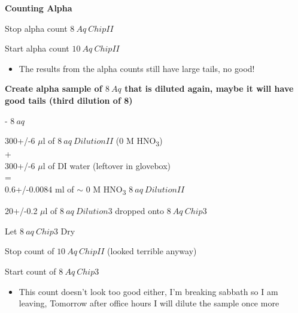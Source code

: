 \documentclass[idxtotoc,hyperref,openany,oneside]{labbook} %
\newcommand{\cmark}{\ding{51}}%
\newcommand{\done}{\rlap{$\square$}{\raisebox{2pt}{\large\hspace{1pt}\cmark}}%
  \hspace{-2.5pt}}
\newcommand{\tsbs}{\textsubscript}
\begin{document}
\textbf{Counting Alpha}
\begin{todolist}
\item[\done]{Stop alpha count $\boxed{8\ Aq\ ChipII}$}
\item[\done]{Start alpha count $\boxed{10\ Aq\ ChipII}$}
  \begin{itemize}
  \item{The results from the alpha counts still have large tails, no good!}
  \end{itemize}
\end{todolist}

\textbf{Create alpha sample of $\boxed{8\ Aq}$ that is diluted again, maybe it will
        have good tails (third dilution of 8)}
\begin{todolist}
\item[\done]{- $\boxed{8\ aq}$}
\end{todolist}
\begin{center}
  300+/-6 $\mu$l of $\boxed{8\ aq\ DilutionII}$
  (0 M HNO\tsbs{3})\\
  +\\
  300+/-6 $\mu$l of DI water (leftover in glovebox)\\
  =\\
  0.6+/-0.0084 ml of $\sim$
  0 M HNO\tsbs{3} $\boxed{8\ aq\ DilutionII}$
\end{center}
\begin{center}
  20+/-0.2 $\mu$l of $\boxed{8\ aq\ Dilution3}$ dropped onto
  $\boxed{8\ Aq\ Chip3}$
\end{center}
\begin{todolist}
\item[\done]{Let $\boxed{8\ aq\ Chip3}$ Dry}
\item[\done]{Stop count of $\boxed{10\ Aq\ ChipII}$ (looked terrible anyway)}
\item[\done]{Start count of $\boxed{8\ Aq\ Chip3}$}
  \begin{itemize}
  \item{This count doesn't look too good either, I'm breaking sabbath  so I am leaving,
    Tomorrow after office hours I will dilute the sample once more}
  \end{itemize}
\end{todolist}


\end{document}
